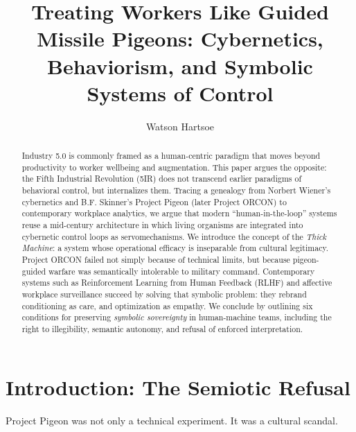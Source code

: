 \documentclass[runningheads]{llncs}
\begin{document}
\title{Treating Workers Like Guided Missile Pigeons: Cybernetics, Behaviorism, and Symbolic Systems of Control}

\author{Watson Hartsoe}

\maketitle

\begin{abstract}
Industry 5.0 is commonly framed as a human-centric paradigm that moves beyond productivity to worker wellbeing and augmentation. This paper argues the opposite: the Fifth Industrial Revolution (5IR) does not transcend earlier paradigms of behavioral control, but internalizes them. Tracing a genealogy from Norbert Wiener's cybernetics and B.F. Skinner's Project Pigeon (later Project ORCON) to contemporary workplace analytics, we argue that modern ``human-in-the-loop'' systems reuse a mid-century architecture in which living organisms are integrated into cybernetic control loops as servomechanisms. We introduce the concept of the \emph{Thick Machine}: a system whose operational efficacy is inseparable from cultural legitimacy. Project ORCON failed not simply because of technical limits, but because pigeon-guided warfare was semantically intolerable to military command. Contemporary systems such as Reinforcement Learning from Human Feedback (RLHF) and affective workplace surveillance succeed by solving that symbolic problem: they rebrand conditioning as care, and optimization as empathy. We conclude by outlining six conditions for preserving \emph{symbolic sovereignty} in human-machine teams, including the right to illegibility, semantic autonomy, and refusal of enforced interpretation.

\end{abstract}

\section{Introduction: The Semiotic Refusal}

Project Pigeon was not only a technical experiment. It was a cultural scandal.
\end{document}
